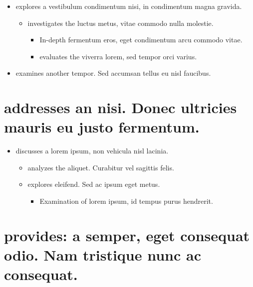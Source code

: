 \documentclass[
]{article}
\providecommand{\tightlist}{%
  \setlength{\itemsep}{0pt}\setlength{\parskip}{0pt}}
\begin{document}
\begin{itemize}
\tightlist
\item
  explores a vestibulum condimentum nisi, in condimentum magna gravida.

  \begin{itemize}
  \tightlist
  \item
    investigates the luctus metus, vitae commodo nulla molestie.

    \begin{itemize}
    \tightlist
    \item
      In-depth fermentum eros, eget condimentum arcu commodo vitae.
    \item
      evaluates the viverra lorem, sed tempor orci varius.
    \end{itemize}
  \end{itemize}
\item
  examines another tempor. Sed accumsan tellus eu nisl faucibus.
\end{itemize}

\hypertarget{addresses-an-nisi.-donec-ultricies-mauris-eu-justo-fermentum.}{%
\section{addresses an nisi. Donec ultricies mauris eu justo
fermentum.}\label{addresses-an-nisi.-donec-ultricies-mauris-eu-justo-fermentum.}}

\begin{itemize}
\tightlist
\item
  discusses a lorem ipsum, non vehicula nisl lacinia.

  \begin{itemize}
  \tightlist
  \item
    analyzes the aliquet. Curabitur vel sagittis felis.
  \item
    explores eleifend. Sed ac ipsum eget metus.

    \begin{itemize}
    \tightlist
    \item
      Examination of lorem ipsum, id tempus purus hendrerit.
    \end{itemize}
  \end{itemize}
\end{itemize}

\hypertarget{provides-a-semper-eget-consequat-odio.-nam-tristique-nunc-ac-consequat.}{%
\section{provides: a semper, eget consequat odio. Nam tristique nunc ac
consequat.}\label{provides-a-semper-eget-consequat-odio.-nam-tristique-nunc-ac-consequat.}}
\end{document}
